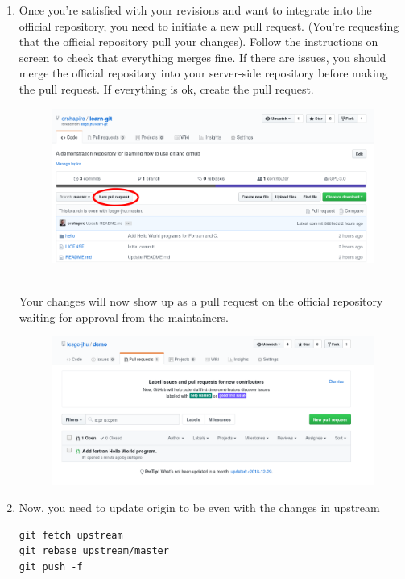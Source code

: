 \documentclass{article}
\begin{document}
\begin{enumerate}
\item Once you're satisfied with your revisions and want to integrate into the official repository, you need to initiate a new pull request.  (You're requesting that the official repository pull your changes). Follow the instructions on screen to check that everything merges fine. If there are issues, you should merge the official repository into your server-side repository before making the pull request. If everything is ok, create the pull request. 
\begin{figure}[h!]
\centering
\includegraphics[width=\textwidth]{pull1.png}
\end{figure}\\
Your changes will now show up as a pull request on the official repository waiting for approval from the maintainers.
\begin{figure}[h!]
\centering
\includegraphics[width=\textwidth]{pull2.png}
\end{figure}

\pagebreak
\item Now, you need to update origin to be even with the changes in upstream
\begin{lstlisting}
git fetch upstream
git rebase upstream/master
git push -f
\end{lstlisting}

\end{enumerate}
\end{document}
